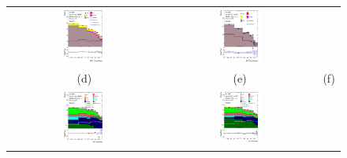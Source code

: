 \begin{figure}[H]
\begin{tabular}{@{}ccc@{}}
\includegraphics[width=0.29\textwidth]{figures/BDT/tcH_reg1l1tau1b3j_os.pdf}&
\includegraphics[width=0.29\textwidth]{figures/BDT/tcH_reg1l2tau1bnj_ss.pdf}\\
(d) & (e)  & (f) \\
\includegraphics[width=0.29\textwidth]{figures/BDT/tcH_reg2mtau1b2jos.pdf}&
\includegraphics[width=0.29\textwidth]{figures/BDT/tcH_reg2mtau1b3jos.pdf}&

\end{tabular}
\end{figure}

